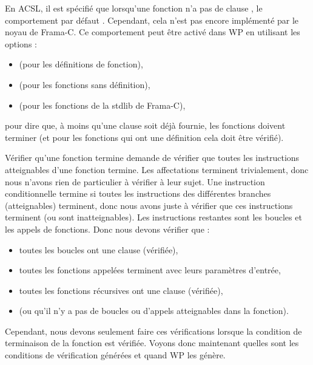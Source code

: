 \begin{Information}
  En ACSL, il est spécifié que lorsqu'une fonction n'a pas de clause
  , le comportement par défaut
  . Cependant, cela n'est pas
  encore implémenté par le noyau de Frama-C. Ce comportement peut être activé
  dans WP en utilisant les options :
  \begin{itemize}
  \item {} (pour les définitions de fonction),
  \item {} (pour les fonctions sans définition),
  \item {} (pour les fonctions de la stdlib de Frama-C),
  \end{itemize}
  pour dire que, à moins qu'une clause soit déjà fournie, les fonctions doivent
  terminer (et pour les fonctions qui ont une définition cela doit être vérifié).
\end{Information}




Vérifier qu'une fonction termine demande de vérifier que toutes les instructions
atteignables d'une fonction termine. Les affectations terminent trivialement,
donc nous n'avons rien de particulier à vérifier à leur sujet. Une instruction
conditionnelle termine si toutes les instructions des différentes branches
(atteignables) terminent, donc nous avons juste à vérifier que ces instructions
terminent (ou sont inatteignables). Les instructions restantes sont les boucles
et les appels de fonctions. Donc nous devons vérifier que :
\begin{itemize}
  \item toutes les boucles ont une clause  (vérifiée),
  \item toutes les fonctions appelées terminent avec leurs paramètres d'entrée,
  \item toutes les fonctions récursives ont une clause  (vérifiée),
  \item (ou qu'il n'y a pas de boucles ou d'appels atteignables dans la fonction).
\end{itemize}


Cependant, nous devons seulement faire ces vérifications lorsque la condition de
terminaison de la fonction est vérifiée. Voyons donc maintenant quelles sont les
conditions de vérification générées et quand WP les génère.


